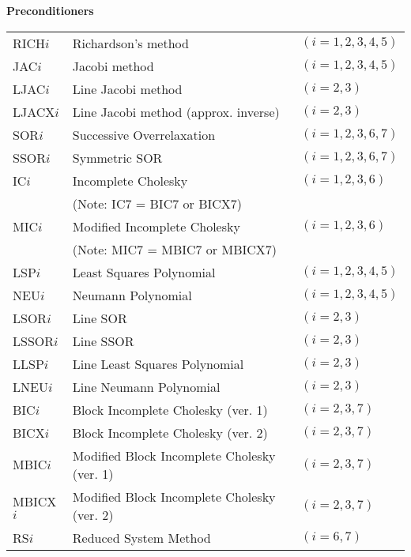 \bigskip
\noindent
{\bf Preconditioners}
\bigskip

\begin{tabular}{lll}
RICH$i$  & Richardson's method
         & $(i=1,2,3,4,5)$                            \\
JAC$i$   & Jacobi method
         & $(i=1,2,3,4,5)$                            \\
LJAC$i$  & Line Jacobi method
         & $(i=2,3)$                                  \\
LJACX$i$ & Line Jacobi method (approx. inverse)
         & $(i=2,3)$                                  \\
SOR$i$   & Successive Overrelaxation
         & $(i=1,2,3,6,7)$                            \\
SSOR$i$  & Symmetric SOR
         & $(i=1,2,3,6,7)$                            \\
IC$i$    & Incomplete Cholesky
         & $(i=1,2,3,6)$                              \\
         & (Note:  IC7 = BIC7 or BICX7)
         &                                            \\
MIC$i$   & Modified Incomplete Cholesky
         & $(i=1,2,3,6)$                              \\
         & (Note:  MIC7 = MBIC7 or MBICX7)
         &                                            \\
LSP$i$   & Least Squares Polynomial
         & $(i=1,2,3,4,5)$                            \\
NEU$i$   & Neumann Polynomial
         & $(i=1,2,3,4,5)$                            \\
LSOR$i$  & Line SOR
         & $(i=2,3)$                                  \\
LSSOR$i$ & Line SSOR
         & $(i=2,3)$                                  \\
LLSP$i$  & Line Least Squares Polynomial
         & $(i=2,3)$                                  \\
LNEU$i$  & Line Neumann Polynomial
         & $(i=2,3)$                                  \\
BIC$i$   & Block Incomplete Cholesky (ver. 1)
         & $(i=2,3,7)$                                \\
BICX$i$  & Block Incomplete Cholesky (ver. 2)
         & $(i=2,3,7)$                                \\
MBIC$i$  & Modified Block Incomplete Cholesky (ver. 1)
         & $(i=2,3,7)$                                \\
MBICX$i$ & Modified Block Incomplete Cholesky (ver. 2)
         & $(i=2,3,7)$                                \\
RS$i$    & Reduced System Method
         & $(i=6,7)$
\end{tabular}

